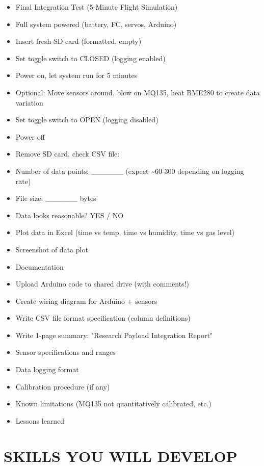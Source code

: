 \documentclass[11pt,letterpaper]{article}
\begin{document}
\begin{itemize}
  \item Final Integration Test (5-Minute Flight Simulation)
  \item Full system powered (battery, FC, servos, Arduino)
  \item Insert fresh SD card (formatted, empty)
  \item Set toggle switch to CLOSED (logging enabled)
  \item Power on, let system run for 5 minutes
  \item Optional: Move sensors around, blow on MQ135, heat BME280 to create data variation
  \item Set toggle switch to OPEN (logging disabled)
  \item Power off
  \item Remove SD card, check CSV file:
  \item Number of data points: \_\_\_\_\_\_ (expect \textasciitilde{}60-300 depending on logging rate)
  \item File size: \_\_\_\_\_\_ bytes
  \item Data looks reasonable? YES / NO
  \item Plot data in Excel (time vs temp, time vs humidity, time vs gas level)
  \item Screenshot of data plot
\end{itemize}

\begin{itemize}
  \item Documentation
  \item Upload Arduino code to shared drive (with comments!)
  \item Create wiring diagram for Arduino + sensors
  \item Write CSV file format specification (column definitions)
  \item Write 1-page summary: "Research Payload Integration Report"
  \item Sensor specifications and ranges
  \item Data logging format
  \item Calibration procedure (if any)
  \item Known limitations (MQ135 not quantitatively calibrated, etc.)
  \item Lessons learned
\end{itemize}

\section{SKILLS YOU WILL DEVELOP}
\end{document}
